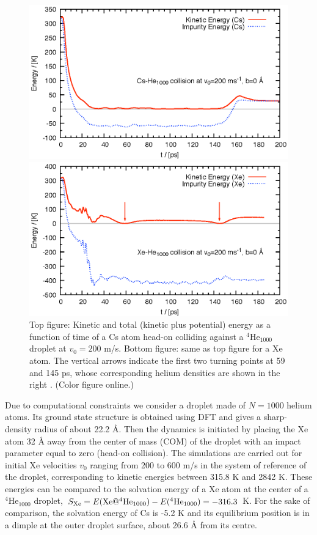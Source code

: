 		\begin{figure}[!]
			\centerline{\includegraphics[width=0.90\linewidth,clip]{fig3-Cs-He}} 
			\centerline{\includegraphics[width=0.90\linewidth,clip]{fig3-Xe-He}}
			\caption{\label{fig3-headon}Top figure: Kinetic and total (kinetic plus potential) energy as a function of time  of a Cs atom head-on colliding against a  $^4$He$_{1000}$ droplet at  $v_0 = 200$ m/s. Bottom figure: same as top figure for a Xe atom. The vertical arrows indicate the first two turning points at 59 and 145 ps, whose corresponding helium densities are shown in the right . (Color figure online.)}
		\end{figure}

		Due to computational constraints we consider a droplet made of $N=1000$ helium atoms. Its ground state structure is obtained using DFT and gives a sharp-density  radius of about 22.2 \AA{}. Then the dynamics is initiated by placing the Xe atom 32 \AA{} away from the center of mass (COM) of the droplet with an impact parameter equal to zero (head-on collision). The simulations are carried out for initial Xe velocities  $v_0$ ranging from 200 to  600 m/s in the system of reference of the droplet, corresponding to kinetic energies between  315.8 K and  2842 K. These energies can be compared to the solvation energy of a Xe atom at the center of a $^4$He$_{1000}$ droplet, $S_{{\rm Xe}} = E({\rm Xe}@^4{\rm He}_{1000}) - E(^4{\rm He}_{1000}) = -316.3$ K. For the sake of comparison, the solvation energy of Cs is -5.2 K and its equilibrium position is  in a dimple at the outer droplet surface, about 26.6 \AA{} from its centre. 

